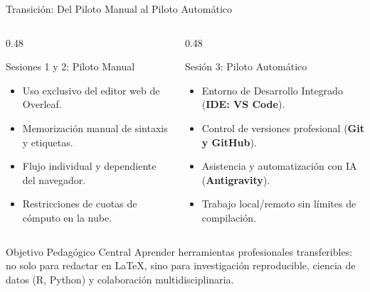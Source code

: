 \documentclass[aspectratio=169, 10pt]{beamer}
\begin{document}
\begin{frame}{Transición: Del Piloto Manual al Piloto Automático}
  \begin{columns}[T]
    \begin{column}{0.48\textwidth}
      \begin{block}{Sesiones 1 y 2: Piloto Manual}
        \small
        \begin{itemize}
          \item Uso exclusivo del editor web de Overleaf.
          \item Memorización manual de sintaxis y etiquetas.
          \item Flujo individual y dependiente del navegador.
          \item Restricciones de cuotas de cómputo en la nube.
        \end{itemize}
      \end{block}
    \end{column}
    
    \begin{column}{0.48\textwidth}
      \begin{block}{Sesión 3: Piloto Automático}
        \small
        \begin{itemize}
          \item Entorno de Desarrollo Integrado (\textbf{IDE: VS Code}).
          \item Control de versiones profesional (\textbf{Git y GitHub}).
          \item Asistencia y automatización con IA (\textbf{Antigravity}).
          \item Trabajo local/remoto sin límites de compilación.
        \end{itemize}
      \end{block}
    \end{column}
  \end{columns}

  \vspace{0.15cm}
  \begin{alertblock}{Objetivo Pedagógico Central}
    \small
    Aprender herramientas profesionales transferibles: no solo para redactar en \LaTeX, sino para investigación reproducible, ciencia de datos (R, Python) y colaboración multidisciplinaria.
  \end{alertblock}
\end{frame}

\end{document}
